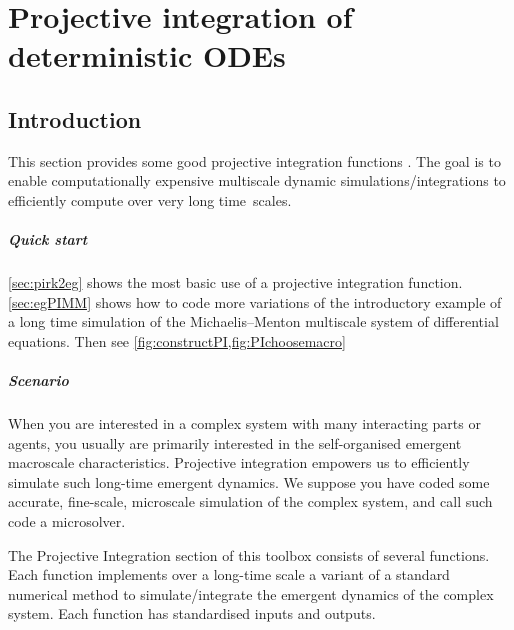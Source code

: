 \chapter{Projective integration of deterministic ODEs}
\label{sec:ProjInt}
\localtableofcontents


\section{Introduction}

This section provides some good projective integration functions \cite[e.g.]{Gear02b, Gear03c, Givon06, Maclean2015, Sieber2018}.
The goal is to enable computationally expensive multiscale dynamic simulations\slash integrations to efficiently compute over very long time~scales.

\paragraph{Quick start} 
\cref{sec:pirk2eg} shows the most basic use of a projective integration function.
\cref{sec:egPIMM} shows how to code more variations of the introductory example of a long time simulation of the Michaelis--Menton multiscale system of differential equations.
Then see \cref{fig:constructPI,fig:PIchoosemacro}

\paragraph{Scenario}
When you are interested in a complex system with many interacting parts or agents, you usually are primarily interested in the self-organised emergent macroscale characteristics.
Projective integration empowers us to efficiently simulate such long-time emergent dynamics.
We suppose you have coded some accurate, fine-scale, microscale simulation of the complex system, and call such code a microsolver.

The Projective Integration section of this toolbox consists of several functions.
Each function implements over a long-time scale a variant of a standard numerical method to simulate\slash integrate the emergent dynamics of the complex system.
Each function has standardised inputs and outputs.


